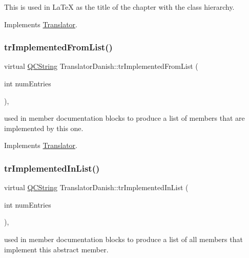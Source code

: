 This is used in La\+TeX as the title of the chapter with the class hierarchy. 

Implements \mbox{\hyperlink{class_translator}{Translator}}.

\mbox{\label{class_translator_danish_a9d0bca8f89d36acc016338d4fec90df1}} 
\subsubsection{\texorpdfstring{trImplementedFromList()}{trImplementedFromList()}}
{\footnotesize\ttfamily virtual \mbox{\hyperlink{class_q_c_string}{Q\+C\+String}} Translator\+Danish\+::tr\+Implemented\+From\+List (\begin{DoxyParamCaption}\item[{int}]{num\+Entries }\end{DoxyParamCaption})\hspace{0.3cm}{\ttfamily [inline]}, {\ttfamily [virtual]}}

used in member documentation blocks to produce a list of members that are implemented by this one. 

Implements \mbox{\hyperlink{class_translator}{Translator}}.

\mbox{\label{class_translator_danish_a70fa6793d0817fea24f31df31aca2fa6}} 
\subsubsection{\texorpdfstring{trImplementedInList()}{trImplementedInList()}}
{\footnotesize\ttfamily virtual \mbox{\hyperlink{class_q_c_string}{Q\+C\+String}} Translator\+Danish\+::tr\+Implemented\+In\+List (\begin{DoxyParamCaption}\item[{int}]{num\+Entries }\end{DoxyParamCaption})\hspace{0.3cm}{\ttfamily [inline]}, {\ttfamily [virtual]}}

used in member documentation blocks to produce a list of all members that implement this abstract member. 

